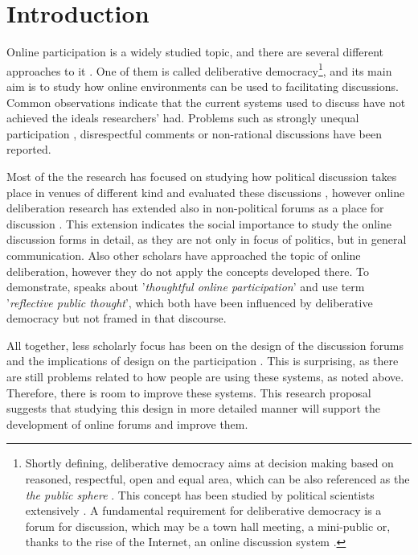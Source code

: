 \documentclass{article}
\begin{document}
\newpage

\setcounter{page}{1}

\section{Introduction}

Online participation is a widely studied topic, and there are several different approaches to it . One of them is called deliberative democracy\footnote{Shortly defining, deliberative democracy aims at decision making based on reasoned, respectful, open and equal area, which can be also referenced as the \textit{the public sphere} \cite{habermas87,fiskin91,cohen97}. This concept has been studied by political scientists extensively . A fundamental requirement for deliberative democracy is a forum for discussion, which may be a town hall meeting, a mini-public or, thanks to the rise of the Internet, an online discussion system .}, and its main aim is to study how online environments can be used to facilitating discussions. Common observations indicate that the current systems used to discuss have not achieved the ideals researchers' had. Problems such as strongly unequal participation , disrespectful comments or non-rational discussions  have been reported.

Most of the the research has focused on studying how political discussion takes place in venues of different kind  and evaluated these discussions , however online deliberation research has extended also in non-political forums as a place for discussion \cite{graham12}. This extension indicates the social importance to study the online discussion forms in detail, as they are not only in focus of politics, but in general communication. Also other scholars have approached the topic of online deliberation, however they do not apply the concepts developed there. To demonstrate,  speaks about '\textit{thoughtful online participation}' and  use term '\textit{reﬂective public thought}', which both have been influenced by deliberative democracy but not framed in that discourse.

All together, less scholarly focus has been on the design of the discussion forums and the implications of design on the participation . This is surprising, as there are still problems related to how people are using these systems, as noted above. Therefore, there is room to improve these systems. This research proposal suggests that studying this design in more detailed manner will support the development of online forums and improve them.
\end{document}
